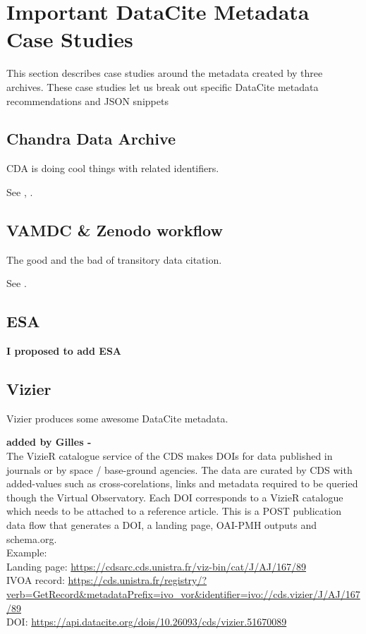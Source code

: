 \documentclass[11pt,a4paper]{ivoa}
\begin{document}
\section{Important DataCite Metadata Case Studies}
This section describes case studies around the metadata created by three archives. 
These case studies let us break out specific DataCite metadata recommendations and JSON snippets

\subsection{Chandra Data Archive}
CDA is doing cool things with related identifiers.

See \citep{2023ChNew..34....5D}, \citep{2018EPJWC.18612011R}.

\subsection{VAMDC \& Zenodo workflow}
The good and the bad of transitory data citation.

See \citep{2018Galax...6..105M}.

\subsection{ESA}
\textbf{\color{red} I proposed to add ESA}

\subsection{Vizier}
Vizier produces some awesome DataCite metadata.


\textbf{\color{red} added by Gilles - }\\

The VizieR  catalogue service of the CDS makes DOIs for data published in journals or by space / base-ground agencies. The data are curated by CDS with added-values such as cross-corelations, links and metadata required to be queried though the Virtual Observatory. Each DOI corresponds to a VizieR catalogue which needs to be attached to a reference article. This is a POST publication data flow that generates a DOI, a landing page, OAI-PMH outputs and schema.org.\\


Example:\\
Landing page: \url{https://cdsarc.cds.unistra.fr/viz-bin/cat/J/AJ/167/89}\\
IVOA record: \url{https://cds.unistra.fr/registry/?verb=GetRecord&metadataPrefix=ivo_vor&identifier=ivo://cds.vizier/J/AJ/167/89}\\
DOI: \url{https://api.datacite.org/dois/10.26093/cds/vizier.51670089}
\end{document}

